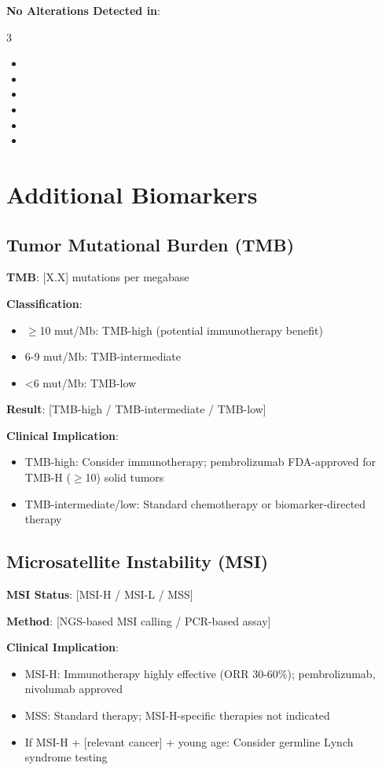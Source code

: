 \documentclass[10pt,letterpaper]{article}
\begin{document}
\textbf{No Alterations Detected in}:
\begin{multicols}{3}
\begin{itemize}
\item [Gene 1]
\item [Gene 2]
\item [Gene 3]
\item [Gene 4]
\item [Gene 5]
\item [Gene 6]
\end{itemize}
\end{multicols}

\section{Additional Biomarkers}

\subsection{Tumor Mutational Burden (TMB)}

\textbf{TMB}: [X.X] mutations per megabase

\textbf{Classification}:
\begin{itemize}
\item $\geq$10 mut/Mb: TMB-high (potential immunotherapy benefit)
\item 6-9 mut/Mb: TMB-intermediate
\item <6 mut/Mb: TMB-low
\end{itemize}

\textbf{Result}: [TMB-high / TMB-intermediate / TMB-low]

\textbf{Clinical Implication}:
\begin{itemize}
\item TMB-high: Consider immunotherapy; pembrolizumab FDA-approved for TMB-H ($\geq$10) solid tumors
\item TMB-intermediate/low: Standard chemotherapy or biomarker-directed therapy
\end{itemize}

\subsection{Microsatellite Instability (MSI)}

\textbf{MSI Status}: [MSI-H / MSI-L / MSS]

\textbf{Method}: [NGS-based MSI calling / PCR-based assay]

\textbf{Clinical Implication}:
\begin{itemize}
\item MSI-H: Immunotherapy highly effective (ORR 30-60\%); pembrolizumab, nivolumab approved
\item MSS: Standard therapy; MSI-H-specific therapies not indicated
\item If MSI-H + [relevant cancer] + young age: Consider germline Lynch syndrome testing
\end{itemize}
\end{document}
